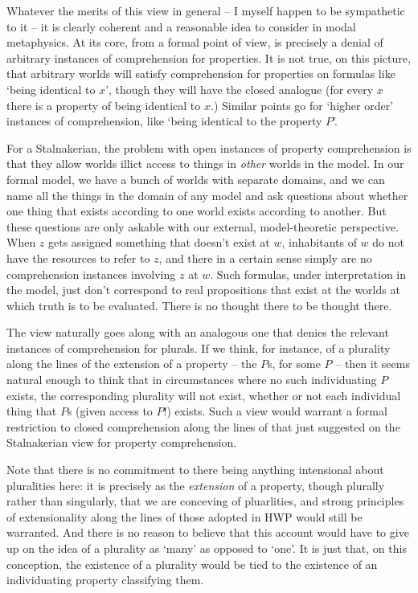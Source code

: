 \documentclass{article}
\begin{document}
Whatever the merits of this view in general -- I myself 
happen to be sympathetic to it -- it is clearly coherent and 
a reasonable idea to consider in modal metaphysics. At its 
core, from a formal point of view, is precisely a denial of 
arbitrary instances of comprehension for properties. It is 
not true, on this picture, that arbitrary worlds will satisfy comprehension for 
properties on formulas like `being identical to $x$', though 
they will have the closed analogue (for every $x$ there is a property 
of being identical to $x$.) Similar points go for `higher order' instances 
of comprehension, like `being identical to the property $P$'.

For a Stalnakerian, the problem with open instances of property comprehension
is that they allow worlds illict access to things in \emph{other} 
worlds in the model.
In our formal model, we have a bunch of worlds with separate domains,
and we can name all the things in the domain of any model and ask 
questions about whether one thing that exists according to one world 
exists according to another. But these questions are only askable with 
our external, model-theoretic perspective. 
When $z$ gets assigned something that doesn't exist at $w$, 
inhabitants of $w$ do not have the resources to refer to $z$, 
and there in a certain sense simply are no comprehension instances 
involving $z$ at $w$.
Such formulas, 
under interpretation in the model,
just don't correspond to real propositions that exist at the 
worlds at which truth is to be evaluated.
There is no thought there to be thought there.

The view naturally goes along with an analogous one that
denies the relevant instances of comprehension for plurals.
If we think, for instance, of a plurality along the lines 
of the extension of a property -- the $P$s, for some $P$ 
-- then it seems natural enough 
to think that in circumstances where no such individuating 
$P$ exists, the corresponding plurality will not exist, 
whether or not each individual thing that $P$s (given access to $P$!) exists. 
Such a view would warrant a formal restriction to closed comprehension 
along the lines of that just suggested on the Stalnakerian view for property 
comprehension.

Note that there is no commitment to 
there being anything intensional about pluralities here: 
it is precisely as the \emph{extension} of a property, though plurally rather than 
singularly, that we are conceving of pluarlities, and strong 
principles of extensionality along the lines of those adopted in HWP 
would still be warranted. And there is no reason to believe that this 
account would have to give up on the idea of a plurality as `many'
as opposed to `one'. It is just that, on this conception, the 
existence of a plurality would be tied to the existence of an 
individuating property classifying them.
\end{document}
